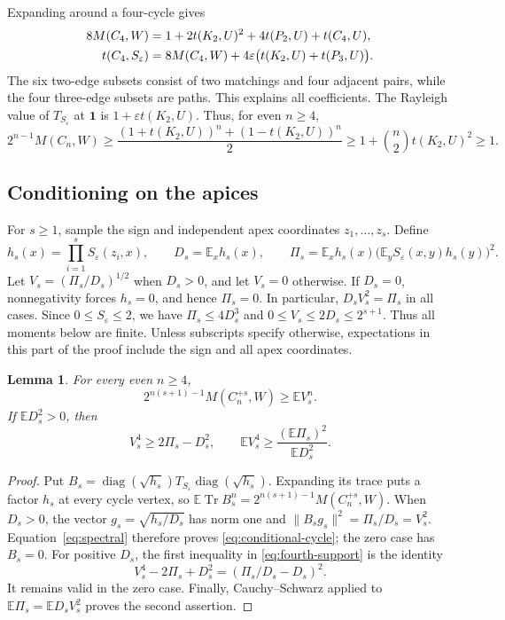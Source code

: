 \documentclass[11pt,a4paper]{article}
\newtheorem{lemma}[theorem]{Lemma}
\theoremstyle{remark}
\numberwithin{equation}{section}
\DeclareMathOperator{\Tr}{Tr}
\DeclareMathOperator{\diag}{diag}
\newcommand{\E}{\mathbb E}
\newcommand{\one}{\mathbf 1}
\begin{document}
Expanding around a four-cycle gives
\begin{align}
 8M(C_4,W)&=1+2t(K_2,U)^2+4t(P_2,U)+t(C_4,U),\notag\\
 t(C_4,S_\varepsilon)
 &=8M(C_4,W)+4\varepsilon\bigl(t(K_2,U)+t(P_3,U)\bigr).
 \label{eq:fourth-colors}
\end{align}
The six two-edge subsets consist of two matchings and four
adjacent pairs, while the four three-edge subsets are paths.
This explains all coefficients. The Rayleigh value of
$T_{S_\varepsilon}$ at $\one$ is $1+\varepsilon t(K_2,U)$.
Thus, for even $n\geq4$,
\begin{equation}\label{eq:even-base}
 2^{n-1}M(C_n,W)
 \geq\frac{(1+t(K_2,U))^n+(1-t(K_2,U))^n}{2}
 \geq1+\binom n2t(K_2,U)^2\geq1.
\end{equation}

\subsection{Conditioning on the apices}

For $s\geq1$, sample the sign and independent apex coordinates
$z_1,\ldots,z_s$. Define
\[
 h_s(x)=\prod_{i=1}^s S_\varepsilon(z_i,x),\qquad
 D_s=\E_xh_s(x),\qquad
 \Pi_s=\E_xh_s(x)\bigl(\E_yS_\varepsilon(x,y)h_s(y)\bigr)^2.
\]
Let $V_s=(\Pi_s/D_s)^{1/2}$ when $D_s>0$, and let $V_s=0$
otherwise. If $D_s=0$, nonnegativity forces $h_s=0$, and hence
$\Pi_s=0$. In particular, $D_sV_s^2=\Pi_s$ in all cases.
Since $0\leq S_\varepsilon\leq2$, we have $\Pi_s\leq4D_s^3$ and
$0\leq V_s\leq2D_s\leq2^{s+1}$. Thus all moments below are finite.
Unless subscripts specify otherwise, expectations in this part of
the proof include the sign and all apex coordinates.

\begin{lemma}\label{lem:conditional}
For every even $n\geq4$,
\begin{equation}\label{eq:conditional-cycle}
 2^{n(s+1)-1}M(C_n^{+s},W)\geq\E V_s^n.
\end{equation}
If $\E D_s^2>0$, then
\begin{equation}\label{eq:fourth-support}
 V_s^4\geq2\Pi_s-D_s^2,
 \qquad \E V_s^4\geq\frac{(\E\Pi_s)^2}{\E D_s^2}.
\end{equation}
\end{lemma}
\begin{proof}
Put $B_s=\diag(\sqrt{h_s})T_{S_\varepsilon}\diag(\sqrt{h_s})$.
Expanding its trace puts a factor $h_s$ at every cycle vertex,
so $\E\Tr B_s^n=2^{n(s+1)-1}M(C_n^{+s},W)$.
When $D_s>0$, the vector
$g_s=\sqrt{h_s/D_s}$ has norm one and
$\|B_sg_s\|^2=\Pi_s/D_s=V_s^2$. Equation~\eqref{eq:spectral}
therefore proves \eqref{eq:conditional-cycle}; the zero case has
$B_s=0$.
For positive $D_s$, the first inequality in
\eqref{eq:fourth-support} is the identity
\[
 V_s^4-2\Pi_s+D_s^2=(\Pi_s/D_s-D_s)^2.
\]
It remains valid in the zero case. Finally, Cauchy--Schwarz applied
to $\E\Pi_s=\E D_sV_s^2$ proves the second assertion.
\end{proof}
\end{document}

